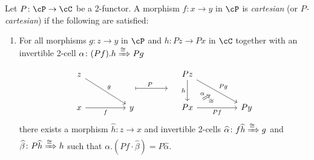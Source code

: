 \documentclass[11pt, dvipsnames]{amsart}
\begin{document}
		\begin{defn}\label{Def:cartesian_1cells}
			Let  $P\colon  \cP \to \cC$ be a 2-functor. A morphism $f\colon x\to y$ in $\cP$ is \emph{cartesian} (or \emph{$P$-cartesian}) if the following are satisfied:

			\begin{enumerate}[label=\stlabel{Def:cartesian_1cells},ref=\arabic*]
			\item \label{Def:cartesian_1cells.1}
            For all morphisms $g\colon z \to y$  in $\cP$ and $h\colon Pz \to Px$  in $\cC$ together with an invertible 2-cell $\alpha\colon (Pf).h \xRightarrow{\cong} Pg$
			\[\begin{tikzcd}[row sep = small]
				z &&&& Pz \\
				&& {} && {} \\
				x && y && Px && Py
				\arrow["g", from=1-1, to=3-3]
				\arrow["h"', from=1-5, to=3-5]
				\arrow[""{name=0, anchor=center, inner sep=0}, "Pg", from=1-5, to=3-7]
				\arrow["P"{pos=0.3}, shorten >=19pt, maps to, from=2-3, to=2-5]
				\arrow["f"', from=3-1, to=3-3]
				\arrow["Pf"', from=3-5, to=3-7]
				\arrow["\alpha","\cong"', shorten <=8pt, shorten >=8pt, Rightarrow, from=3-5, to=0]
			\end{tikzcd}\]
			 there exists a morphism $\widehat{h}\colon z \to x$ and invertible 2-cells $\widehat{\alpha}\colon f\widehat{h}\xRightarrow{\cong} g$ and $\widehat{\beta}\colon P\widehat{h}\xRightarrow{\cong} h$ such that $\alpha.(Pf\cdot\widehat{\beta}) = P\widehat{\alpha}$.


\end{enumerate}
\end{defn}
\end{document}
